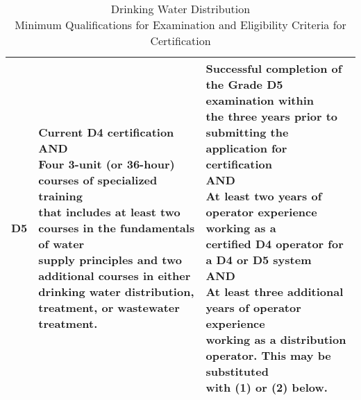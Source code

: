 \begin{table}[H]
\begin{tabular}{|c|p{7.1cm}|p{7cm}|}
D5    & \makecell[l]{Current D4 certification\\AND\\Four 3-unit (or 36-hour) courses of specialized training\\ that includes at least two courses in the fundamentals of water\\supply principles and two additional courses in either\\ drinking water distribution, treatment, or wastewater treatment.} & \makecell[l]{Successful completion of the Grade D5 examination within\\the three years prior to submitting the application for\\certification\\AND\\At least two years of operator experience working as a\\certified D4 operator for a D4 or D5 system\\AND\\At least three additional years of operator experience\\working as a distribution operator. This may be substituted\\with (1) or (2) below.}\\ \hline
\end{tabular}

\footnotesize{\caption{Drinking Water Distribution\\
Minimum Qualifications for Examination and Eligibility Criteria for Certification}}

\end{table}
